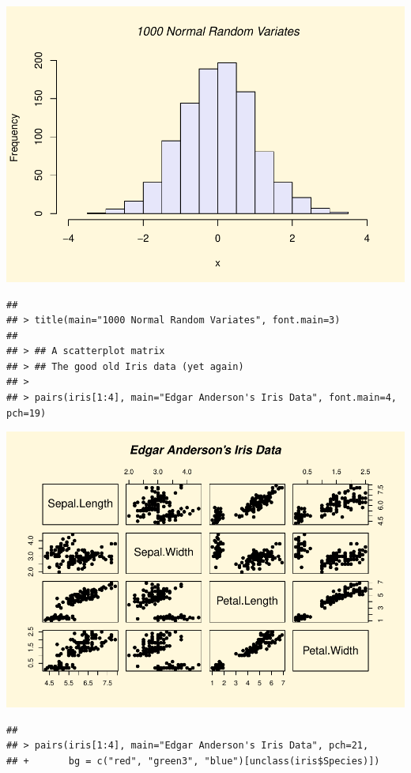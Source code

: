 \documentclass[
]{book}
\begin{document}
\includegraphics{bookdown-demo_files/figure-latex/unnamed-chunk-5-7.pdf}

\begin{verbatim}
## 
## > title(main="1000 Normal Random Variates", font.main=3)
## 
## > ## A scatterplot matrix
## > ## The good old Iris data (yet again)
## > 
## > pairs(iris[1:4], main="Edgar Anderson's Iris Data", font.main=4, pch=19)
\end{verbatim}

\includegraphics{bookdown-demo_files/figure-latex/unnamed-chunk-5-8.pdf}

\begin{verbatim}
## 
## > pairs(iris[1:4], main="Edgar Anderson's Iris Data", pch=21,
## +       bg = c("red", "green3", "blue")[unclass(iris$Species)])
\end{verbatim}
\end{document}
